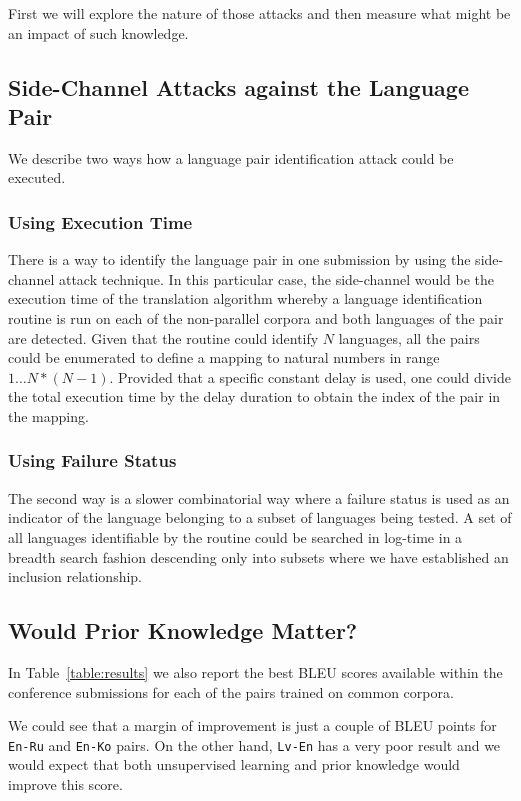 \documentclass[]{article}
\begin{document}
First we will explore the nature of those attacks and then measure what might be an impact of such knowledge.

\subsection{Side-Channel Attacks against the Language Pair}
\label{sect:attack}

We describe two ways how a language pair identification attack could be executed.

\subsubsection{Using Execution Time}

There is a way to identify the language pair in one submission by using the side-channel attack technique.
In this particular case, the side-channel would be the execution time of the translation algorithm whereby a language identification routine is run on each of the non-parallel corpora and both languages of the pair are detected.
Given that the routine could identify $N$ languages, all the pairs could be enumerated to define a mapping to natural numbers in range $1\dots N*(N-1)$.
Provided that a specific constant delay is used, one could divide the total execution time by the delay duration to obtain the index of the pair in the mapping.

\subsubsection{Using Failure Status}

The second way is a slower combinatorial way where a failure status is used as an indicator of the language belonging to a subset of languages being tested.
A set of all languages identifiable by the routine could be searched in log-time in a breadth search fashion descending only into subsets where we have established an inclusion relationship.

\subsection{Would Prior Knowledge Matter?}
\label{sect:prior}

In Table~\ref{table:results} we also report the best BLEU scores available within the conference submissions for each of the pairs trained on common corpora.

We could see that a margin of improvement is just a couple of BLEU points for {\tt En-Ru} and {\tt En-Ko} pairs.
On the other hand, {\tt Lv-En} has a very poor result and we would expect that both unsupervised learning and prior knowledge would improve this score.
\end{document}
